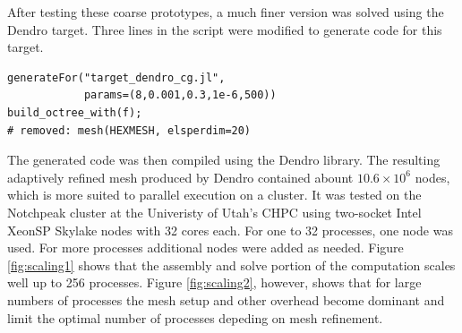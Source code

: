 \documentclass[twoside,leqno,twocolumn]{article}
\begin{document}
After testing these coarse prototypes, a much finer version was solved using the Dendro target. Three lines in the script were modified to generate code for this target. 
\begin{verbatim}
generateFor("target_dendro_cg.jl", 
            params=(8,0.001,0.3,1e-6,500))
build_octree_with(f);
# removed: mesh(HEXMESH, elsperdim=20)
\end{verbatim}
The generated code was then compiled using the Dendro library. The resulting adaptively refined mesh produced by Dendro contained abount $10.6\times 10^{6}$ nodes, which is more suited to parallel execution on a cluster. It was tested on the Notchpeak cluster at the Univeristy of Utah's CHPC using two-socket Intel XeonSP Skylake nodes with 32 cores each. For one to 32 processes, one node was used. For more processes additional nodes were added as needed. Figure \ref{fig:scaling1} shows that the assembly and solve portion of the computation scales well up to 256 processes. Figure \ref{fig:scaling2}, however, shows that for large numbers of processes the mesh setup and other overhead become dominant and limit the optimal number of processes depeding on mesh refinement.
\end{document}
